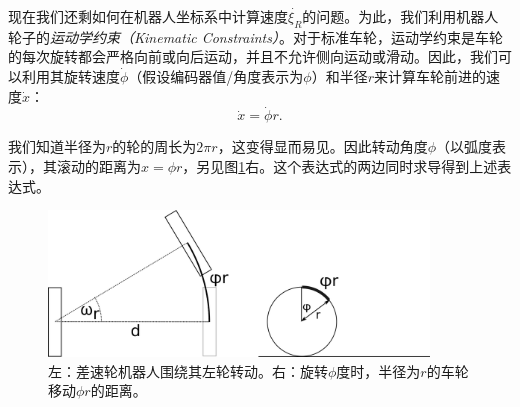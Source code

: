 现在我们还剩如何在机器人坐标系中计算速度$\dot{\xi_R}$的问题。为此，我们利用机器人轮子的\emph{运动学约束（Kinematic Constraints）}。对于标准车轮，运动学约束是车轮的每次旋转都会严格向前或向后运动，并且不允许侧向运动或滑动。因此，我们可以利用其旋转速度$\dot{\phi}$（假设编码器值/角度表示为$\phi$）和半径$r$来计算车轮前进的速度$\dot{x}$：
\begin{equation}
\dot{x}=\dot{\phi}r.
\end{equation}


我们知道半径为$r$的轮的周长为$2\pi r$，这变得显而易见。因此转动角度$\phi$（以弧度表示），其滚动的距离为$x=\phi r$，另见图\ref{fig:wheelrotation}右。这个表达式的两边同时求导得到上述表达式。

\begin{figure}[htb!]
	\centering
		\includegraphics[width=0.9\textwidth]{figs/wheelrotation.png}
	\caption{左：差速轮机器人围绕其左轮转动。右：旋转$\phi$度时，半径为$r$的车轮移动$\phi r$的距离。}
	\label{fig:wheelrotation}
\end{figure}



